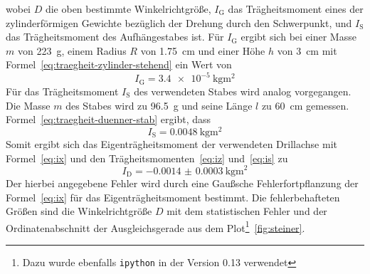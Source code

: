 %
wobei $D$ die oben bestimmte Winkelrichtgröße, $I_\text{G}$ das
Trägheitsmoment eines der zylinderförmigen Gewichte bezüglich der
Drehung durch den Schwerpunkt, und $I_\text{S}$ das Trägheitsmoment des
Aufhängestabes ist.  Für $I_\text{G}$ ergibt sich bei einer Masse $m$
von \SI{223}{\gram}, einem Radius $R$ von \SI{1.75}{\centi\metre} und
einer Höhe $h$ von \SI{3}{\centi\metre} mit
Formel~\eqref{eq:traegheit-zylinder-stehend} ein Wert von
%
\begin{equation}
I_\text{G} = \SI{3.4e-5}{\kilo\gram\metre^2}
\label{eq:iz}
\end{equation}
%
Für das Trägheitsmoment $I_\text{S}$ des verwendeten Stabes wird analog
vorgegangen. Die Masse $m$ des Stabes wird zu \SI{96.5}{\gram} und seine
Länge $l$ zu \SI{60}{\centi\metre} gemessen.
Formel~\eqref{eq:traegheit-duenner-stab} ergibt, dass
%
\begin{equation}
I_\text{S} = \SI{0.0048}{\kilo\gram\metre^2}
\label{eq:is}
\end{equation}
%
Somit ergibt sich das Eigenträgheitsmoment der verwendeten Drillachse
mit Formel~\eqref{eq:ix} und den Trägheitsmomenten~\eqref{eq:iz}
und~\eqref{eq:is} zu
%
\begin{equation}
I_\text{D} = \SI{-0.0014(3)}{\kilo\gram\metre^2}
\end{equation}
%
Der hierbei angegebene Fehler wird durch eine Gaußsche
Fehlerfortpflanzung der Formel~\eqref{eq:ix} für das
Eigenträgheitsmoment bestimmt. Die fehlerbehafteten Größen sind die
Winkelrichtgröße $D$ mit dem statistischen Fehler und der
Ordinatenabschnitt der Ausgleichsgerade aus dem Plot\footnote{Dazu wurde
  ebenfalls \texttt{ipython} in der Version 0.13
  verwendet}~\ref{fig:steiner}.
%
\FloatBarrier
